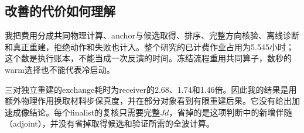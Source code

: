 \subsection{改善的代价如何理解}
我把费用分成共同物理计算、anchor与候选取得、排序、完整方向核验、离线诊断和真正重建，拒绝动作和失败也计入。整个研究的已计费作业占用为5.545小时；这个数是执行账本，不能当成一次反演的时间。冻结流程重用共同算子，数秒的warm选择也不能代表冷启动。

三对独立重建的exchange耗时为receiver的2.68、1.74和1.46倍。因此我的结果是用额外物理作用换取材料步保真度，并在部分对象看到有限重建后果。它没有给出加速成像结论。每个finalist的复核只需要完整$Jd$，省掉的是这项判断中的新增伴随（adjoint），并没有省掉取得候选和验证所需的全波计算。
